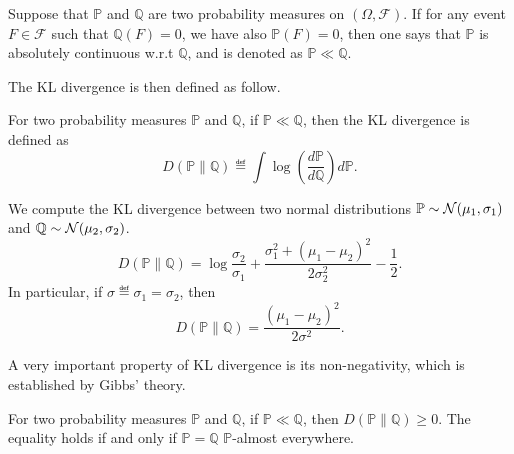 \begin{definition}\label{def:maths.absolute_continuous}
	Suppose that $\mathbb{P}$ and $\mathbb{Q}$ are two probability measures on $(\Omega,\mathcal{F})$. If for any event $F \in \mathcal{F}$ such that $\mathbb{Q}(F) = 0$, we have also $\mathbb{P}(F) = 0$, then one says that $\mathbb{P}$ is absolutely continuous w.r.t $\mathbb{Q}$, and is denoted as $\mathbb{P} \ll \mathbb{Q}$.
\end{definition}

The KL divergence is then defined as follow.

\begin{definition}[KL divergence]\label{def:maths.kl}
	For two probability measures $\mathbb{P}$ and $\mathbb{Q}$, if $\mathbb{P} \ll \mathbb{Q}$, then the KL divergence is defined as
	\[
		D(\mathbb{P} \lVert \mathbb{Q}) \eqdef \int \log(\frac{d\mathbb{P}}{d\mathbb{Q}})d\mathbb{P}.
	\]
\end{definition}

\begin{example}
	We compute the KL divergence between two normal distributions $\mathbb{P}\sim\mathcal{N}(\mu_1,\sigma_1)$ and $\mathbb{Q}\sim\mathcal{N}(\mu_2,\sigma_2)$.
	\[
		D(\mathbb{P} \lVert \mathbb{Q}) = \log \frac{\sigma_2}{\sigma_1} + \frac{\sigma_1^2+(\mu_1-\mu_2)^2}{2\sigma_2^2} - \frac{1}{2}.
	\]
In particular, if $\sigma\eqdef\sigma_1=\sigma_2$, then
	\[
		D(\mathbb{P} \lVert \mathbb{Q}) = \frac{(\mu_1-\mu_2)^2}{2\sigma^2}.
	\]
\end{example}

A very important property of KL divergence is its non-negativity, which is established by Gibbs' theory.

\begin{theorem}\label{thm:maths.gibbs}
	For two probability measures $\mathbb{P}$ and $\mathbb{Q}$, if $\mathbb{P} \ll \mathbb{Q}$, then $D(\mathbb{P} \lVert \mathbb{Q}) \geq 0$. The equality holds if and only if $\mathbb{P} = \mathbb{Q}$ $\mathbb{P}$-almost everywhere. 
\end{theorem}


